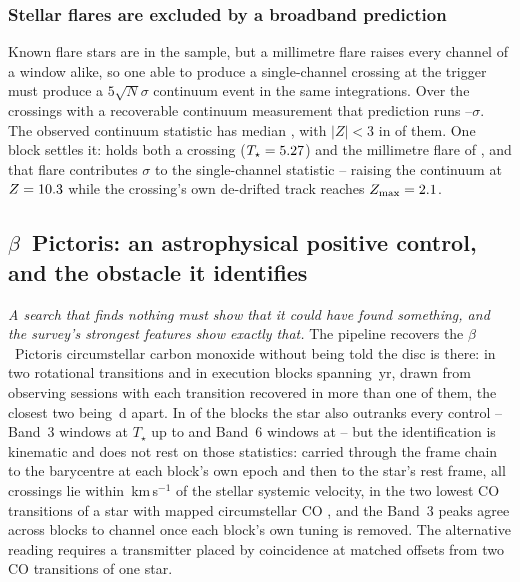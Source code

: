 \subsubsection{Stellar flares are excluded by a broadband prediction}

Known flare stars are in the sample, but a millimetre flare raises every
channel of a window alike, so one able to produce a single-channel crossing at
the trigger must produce a $5\sqrt{N}\sigma$ continuum event in the same
integrations. Over the \FlNCont{} crossings with a recoverable continuum measurement
that prediction runs \FlPredLo--\FlPredHi$\sigma$. The observed continuum
statistic has median \FlObsMed, with $|Z|<3$ in \FlNQuiet{} of them. One block settles it: \FlEgStar{} \texttt{\FlEgEb} holds both a
crossing ($T_\star=5.27$) and the millimetre flare of
\citet{MacGregor2020}, and that flare contributes \FlEgContrib$\sigma$
to the single-channel statistic -- raising the continuum at $Z=10.3$
while the crossing's own de-drifted track reaches $Z_{\max}=2.1$.

\subsection{$\beta$~Pictoris: an astrophysical positive control, and the
obstacle it identifies} \label{sec:bpicval}

\emph{A search that finds nothing must show that it could have found
something, and the survey's strongest features show exactly that.} The
pipeline recovers the $\beta$~Pictoris circumstellar carbon monoxide
without being told the disc is there: in two
rotational transitions and in \CsBpCoBlocks{} execution
blocks spanning \BpBaselineYr\,yr, drawn from \CsBpCoSess{}
observing sessions with each transition recovered in more than one of them,
the closest two being \CsBpCoSepMinD\,d apart.
In \NStageOneBpicEb{} of the blocks the star also outranks every control --
\BpicNFlagThree{} Band~3 windows at $T_\star$ up to \BpicBThreeTsym{} and
\BpicNFlagSix{} Band~6 windows at \BpicBSixTsym{} -- but the identification
is kinematic and does not rest on those
statistics: carried through the frame chain to the barycentre at each
block's own epoch and then to the star's rest frame, all \BpicPanelNCo{}
crossings lie within \BpicDvCoHi\,km\,s$^{-1}$ of the stellar systemic
velocity, in the two lowest CO transitions of a star with mapped
circumstellar CO \citep{Dent2014,Matra2017}, and the Band~3 peaks agree
across blocks to \BpRecThreeTuneChanMax{} channel once each block's own
tuning is removed. The alternative reading
requires a transmitter placed by coincidence at matched offsets from two CO
transitions of one star.

